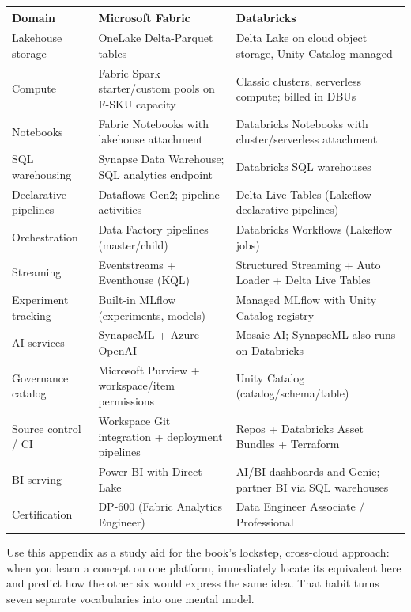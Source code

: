\begin{center}
\footnotesize
\begin{tabular}{@{}p{4.6cm}p{5.2cm}p{5.2cm}@{}}
\toprule
\textbf{Domain} & \textbf{Microsoft Fabric} & \textbf{Databricks} \\
\midrule
Lakehouse storage & OneLake Delta-Parquet tables & Delta Lake on cloud object storage, Unity-Catalog-managed \\
Compute & Fabric Spark starter/custom pools on F-SKU capacity & Classic clusters, serverless compute; billed in DBUs \\
Notebooks & Fabric Notebooks with lakehouse attachment & Databricks Notebooks with cluster/serverless attachment \\
SQL warehousing & Synapse Data Warehouse; SQL analytics endpoint & Databricks SQL warehouses \\
Declarative pipelines & Dataflows Gen2; pipeline activities & Delta Live Tables (Lakeflow declarative pipelines) \\
Orchestration & Data Factory pipelines (master/child) & Databricks Workflows (Lakeflow jobs) \\
Streaming & Eventstreams + Eventhouse (KQL) & Structured Streaming + Auto Loader + Delta Live Tables \\
Experiment tracking & Built-in MLflow (experiments, models) & Managed MLflow with Unity Catalog registry \\
AI services & SynapseML + Azure OpenAI & Mosaic AI; SynapseML also runs on Databricks \\
Governance catalog & Microsoft Purview + workspace/item permissions & Unity Catalog (catalog/schema/table) \\
Source control / CI & Workspace Git integration + deployment pipelines & Repos + Databricks Asset Bundles + Terraform \\
BI serving & Power BI with Direct Lake & AI/BI dashboards and Genie; partner BI via SQL warehouses \\
Certification & DP-600 (Fabric Analytics Engineer) & Data Engineer Associate / Professional \\
\bottomrule
\end{tabular}
\end{center}

\begin{tipbox}
Use this appendix as a study aid for the book's lockstep, cross-cloud approach: when you learn a
concept on one platform, immediately locate its equivalent here and predict how the other six
would express the same idea. That habit turns seven separate vocabularies into one mental model.
\end{tipbox}
